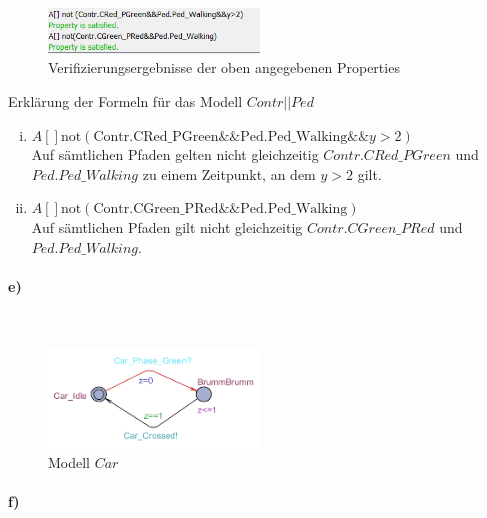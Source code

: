 \begin{figure}[H] 
	\centering 
	\includegraphics[width=0.5\textwidth]{./UPAAAL_Screens/2d_verifyer_Checkd}
	\caption[Aufgabe 2d)]{Verifizierungsergebnisse der oben angegebenen Properties}    
\end{figure}

Erklärung der Formeln für das Modell $Contr||Ped$

\begin{enumerate}[i)]
	
	\item $A \left[\right] \text{not} (\text{Contr.CRed\_PGreen} \&\& \text{Ped.Ped\_Walking} \&\& y>2)$\\
	Auf sämtlichen Pfaden gelten nicht gleichzeitig $Contr.CRed\_PGreen$ und $Ped.Ped\_Walking$ zu einem Zeitpunkt, an dem $y>2$ gilt.
	
	\item $A \left[\right] \text{not} (\text{Contr.CGreen\_PRed} \&\& \text{Ped.Ped\_Walking}) $\\
	Auf sämtlichen Pfaden gilt nicht gleichzeitig $Contr.CGreen\_PRed$ und $Ped.Ped\_Walking$.
\end{enumerate}




\paragraph{e)}\mbox{} \\

\begin{figure}[H] 
	\centering 
	\includegraphics[width=0.5\textwidth]{./UPAAAL_Screens/Car}
	\caption[Aufgabe 2c)]{Modell $Car$}    
\end{figure}


\paragraph{f)}\mbox{} \\

